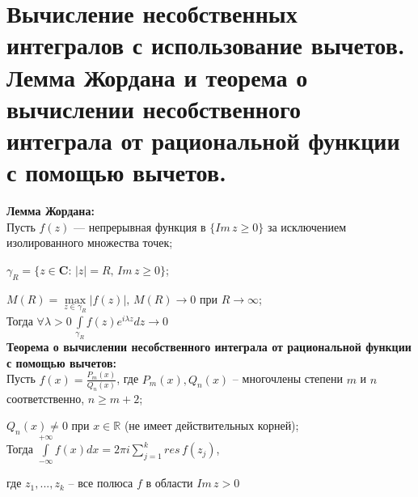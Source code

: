 \newpage 
\section{Вычисление несобственных интегралов с использование вычетов. Лемма Жордана и теорема о вычислении несобственного интеграла от рациональной функции с помощью вычетов.}

\textbf{Лемма Жордана:}\\[2mm]
Пусть  $f(z)$ --- непрерывная функция в $\{Im\,z \geq 0\}$ за исключением изолированного множества точек;

$\gamma_{R} =\{z\in\mathbf{C}: \, |z|=R, \, Im\,z\geq 0\}$;

$M(R)=\underset{z\in \gamma_{R}}{\max}|f(z)|, \, M(R) \rightarrow 0$ при $R\rightarrow \infty$;\\[2mm]
Тогда $\forall \lambda > 0 \, \int\limits_{\gamma_{R}} f(z)e^{i\lambda z}dz\rightarrow 0$\\[4mm]

\textbf{Теорема о вычислении несобственного интеграла от рациональной функции с помощью вычетов:}\\[2mm]
Пусть  $f(x)=\frac{P_m(x)}{Q_n(x)}$, где $P_m(x), Q_n(x)$ -- многочлены степени $m$ и $n$ соответственно, $n\geq m+2$;

$Q_n(x)\neq 0$ при $x \in \mathbb{R}$ (не имеет действительных корней);\\[2mm]
Тогда $\int\limits_{-\infty}^{+\infty}f(x)dx=2\pi i \sum_{j=1}^k res\,f(z_j)$, 

где $z_1, ...,z_k$ -- все полюса $f$ в области $Im\,z >0$\\[2mm]

